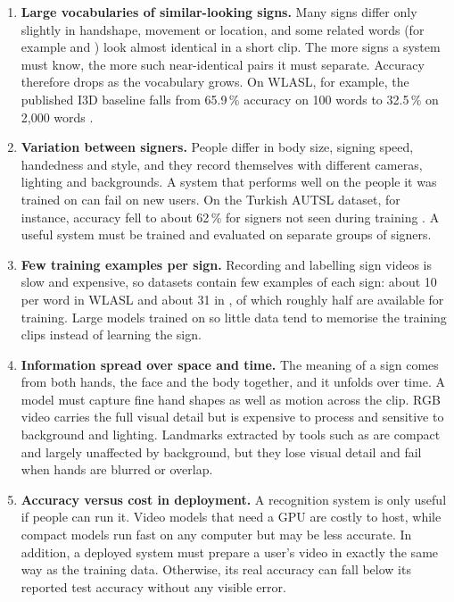 \begin{enumerate}[label=\textbf{C\arabic*.}, leftmargin=2.6em]
  \item \textbf{Large vocabularies of similar-looking signs.} Many signs
  differ only slightly in handshape, movement or location, and some
  related words (for example  and ) look
  almost identical in a short clip. The more signs a system must know, the
  more such near-identical pairs it must separate. Accuracy therefore
  drops as the vocabulary grows. On WLASL, for example, the published I3D
  baseline falls from 65.9\,\% \topone{} accuracy on 100 words to
  32.5\,\% on 2,000 words \cite{li2020wlasl}.

  \item \textbf{Variation between signers.} People differ in body size,
  signing speed, handedness and style, and they record themselves with
  different cameras, lighting and backgrounds. A system that performs well
  on the people it was trained on can fail on new users. On the Turkish
  AUTSL dataset, for instance, accuracy fell to about 62\,\% for signers
  not seen during training \cite{sincan2020autsl}. A useful system must
  be trained and evaluated on separate groups of signers.

  \item \textbf{Few training examples per sign.} Recording and labelling
  sign videos is slow and expensive, so datasets contain few examples of
  each sign: about 10 per word in WLASL \cite{li2020wlasl} and about 31
  in \aslc{} \cite{desai2023aslcitizen}, of which roughly half are
  available for training. Large models trained on so little data tend to
  memorise the training clips instead of learning the sign.

  \item \textbf{Information spread over space and time.} The meaning of a
  sign comes from both hands, the face and the body together, and it
  unfolds over time. A model must capture fine hand shapes as well as
  motion across the clip. RGB video carries the full visual detail but is
  expensive to process and sensitive to background and lighting.
  Landmarks extracted by tools such as \mediapipe{} are compact and
  largely unaffected by background, but they lose visual detail and fail
  when hands are blurred or overlap.

  \item \textbf{Accuracy versus cost in deployment.} A recognition system
  is only useful if people can run it. Video models that need a GPU are
  costly to host, while compact models run fast on any computer but may
  be less accurate. In addition, a deployed system must prepare a user's
  video in exactly the same way as the training data. Otherwise, its real
  accuracy can fall below its reported test accuracy without any visible
  error.
\end{enumerate}

